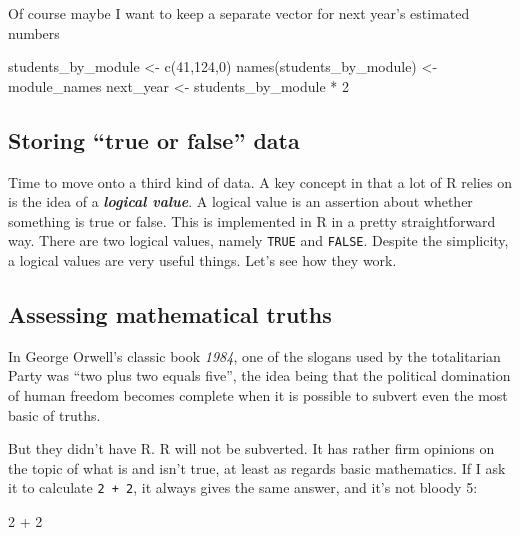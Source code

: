 \documentclass[
]{book}
\newenvironment{Shaded}{\begin{snugshade}}{\end{snugshade}}
\newcommand{\DecValTok}[1]{\textcolor[rgb]{0.00,0.00,0.81}{#1}}
\newcommand{\FunctionTok}[1]{\textcolor[rgb]{0.00,0.00,0.00}{#1}}
\newcommand{\NormalTok}[1]{#1}
\newcommand{\OtherTok}[1]{\textcolor[rgb]{0.56,0.35,0.01}{#1}}
\newcommand{\SpecialCharTok}[1]{\textcolor[rgb]{0.00,0.00,0.00}{#1}}
\begin{document}
Of course maybe I want to keep a separate vector for next year's estimated numbers

\begin{Shaded}
\begin{Highlighting}[]
\NormalTok{students\_by\_module }\OtherTok{\textless{}{-}} \FunctionTok{c}\NormalTok{(}\DecValTok{41}\NormalTok{,}\DecValTok{124}\NormalTok{,}\DecValTok{0}\NormalTok{)}
\FunctionTok{names}\NormalTok{(students\_by\_module) }\OtherTok{\textless{}{-}}\NormalTok{ module\_names}
\NormalTok{next\_year }\OtherTok{\textless{}{-}}\NormalTok{ students\_by\_module }\SpecialCharTok{*} \DecValTok{2}
\end{Highlighting}
\end{Shaded}

\hypertarget{logicals}{%
\subsection{Storing ``true or false'' data}\label{logicals}}

Time to move onto a third kind of data. A key concept in that a lot of R relies on is the idea of a \textbf{\emph{logical value}}. A logical value is an assertion about whether something is true or false. This is implemented in R in a pretty straightforward way. There are two logical values, namely \texttt{TRUE} and \texttt{FALSE}. Despite the simplicity, a logical values are very useful things. Let's see how they work.

\hypertarget{assessing-mathematical-truths}{%
\subsection{Assessing mathematical truths}\label{assessing-mathematical-truths}}

In George Orwell's classic book \emph{1984}, one of the slogans used by the totalitarian Party was ``two plus two equals five'', the idea being that the political domination of human freedom becomes complete when it is possible to subvert even the most basic of truths.

But they didn't have R. R will not be subverted. It has rather firm opinions on the topic of what is and isn't true, at least as regards basic mathematics. If I ask it to calculate \texttt{2\ +\ 2}, it always gives the same answer, and it's not bloody 5:

\begin{Shaded}
\begin{Highlighting}[]
\DecValTok{2} \SpecialCharTok{+} \DecValTok{2}
\end{Highlighting}
\end{Shaded}
\end{document}
